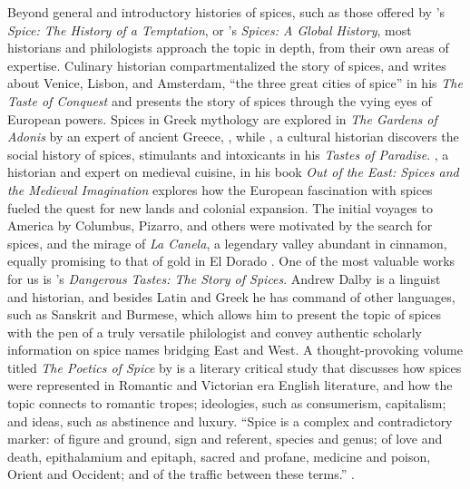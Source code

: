 Beyond general and introductory histories of spices, such as those offered by \textcite{turner_spice_2004}'s \textit{Spice: The History of a Temptation}, or \textcite{czarra_spices_2009}'s \textit{Spices: A Global History}, most historians and philologists approach the topic in depth, from their own areas of expertise. Culinary historian \textcite{krondl_taste_2007} compartmentalized the story of spices, and writes about Venice, Lisbon, and Amsterdam, ``the three great cities of spice'' in his \textit{The Taste of Conquest} and presents the story of spices through the vying eyes of European powers. Spices in Greek mythology are explored in \textit{The Gardens of Adonis} by an expert of ancient Greece, \textcite{detienne_gardens_1994}, while \textcite{schivelbusch_tastes_1992}, a cultural historian discovers the social history of spices, stimulants and intoxicants in his \textit{Tastes of Paradise}. \textcite{freedman_out_2008}, a historian and expert on medieval cuisine, in his book \textit{Out of the East: Spices and the Medieval Imagination} explores how the European fascination with spices fueled the quest for new lands and colonial expansion. The initial voyages to America by Columbus, Pizarro, and others were motivated by the search for spices, and the mirage of \textit{La Canela}, a legendary valley abundant in cinnamon, equally promising to that of gold in El Dorado \autocite{dalby_christopher_2001}. One of the most valuable works for us is \textcite{dalby_dangerous_2000}'s \textit{Dangerous Tastes: The Story of Spices}. Andrew Dalby is a linguist and historian, and besides Latin and Greek he has command of other languages, such as Sanskrit and Burmese, which allows him to present the topic of spices with the pen of a truly versatile philologist and convey authentic scholarly information on spice names bridging East and West. A thought-provoking volume titled \textit{The Poetics of Spice} by \textcite{morton_poetics_2006} is a literary critical study that discusses how spices were represented in Romantic and Victorian era English literature, and how the topic connects to romantic tropes; ideologies, such as consumerism, capitalism; and ideas, such as abstinence and luxury. ``Spice is a complex and contradictory marker: of figure and ground, sign and referent, species and genus; of love and death, epithalamium and epitaph, sacred and profane, medicine and poison, Orient and Occident; and of the traffic between these terms.'' \autocite[9]{morton_poetics_2006}.

